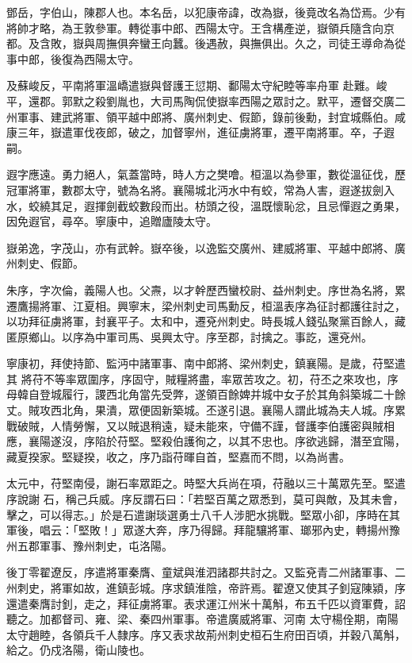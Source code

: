 \begin{pinyinscope}
 鄧岳，字伯山，陳郡人也。本名岳，以犯康帝諱，改為嶽，後竟改名為岱焉。少有將帥才略，為王敦參軍。轉從事中郎、西陽太守。王含構產逆，嶽領兵隨含向京都。及含敗，嶽與周撫俱奔蠻王向蠶。後遇赦，與撫俱出。久之，司徒王導命為從事中郎，後復為西陽太守。



 及蘇峻反，平南將軍溫嶠遣嶽與督護王愆期、鄱陽太守紀睦等率舟軍
 赴難。峻平，還郡。郭默之殺劉胤也，大司馬陶侃使嶽率西陽之眾討之。默平，遷督交廣二州軍事、建武將軍、領平越中郎將、廣州刺史、假節，錄前後勳，封宜城縣伯。咸康三年，嶽遣軍伐夜郎，破之，加督寧州，進征虜將軍，遷平南將軍。卒，子遐嗣。



 遐字應遠。勇力絕人，氣蓋當時，時人方之樊噲。桓溫以為參軍，數從溫征伐，歷冠軍將軍，數郡太守，號為名將。襄陽城北沔水中有蛟，常為人害，遐遂拔劍入水，蛟繞其足，遐揮劍截蛟數段而出。枋頭之役，溫既懷恥忿，且忌憚遐之勇果，因免遐官，尋卒。寧康中，追贈廬陵太守。



 嶽弟逸，字茂山，亦有武幹。嶽卒後，以逸監交廣州、建威將軍、平越中郎將、廣州刺史、假節。



 朱序，字次倫，義陽人也。父燾，以才幹歷西蠻校尉、益州刺史。序世為名將，累遷鷹揚將軍、江夏相。興寧末，梁州刺史司馬勳反，桓溫表序為征討都護往討之，以功拜征虜將軍，封襄平子。太和中，遷兗州刺史。時長城人錢弘聚黨百餘人，藏匿原鄉山。以序為中軍司馬、吳興太守。序至郡，討擒之。事訖，還兗州。



 寧康初，拜使持節、監沔中諸軍事、南中郎將、梁州刺史，鎮襄陽。是歲，苻堅遣其
 將苻不等率眾圍序，序固守，賊糧將盡，率眾苦攻之。初，苻丕之來攻也，序母韓自登城履行，謖西北角當先受弊，遂領百餘婢并城中女子於其角斜築城二十餘丈。賊攻西北角，果潰，眾便固新築城。丕遂引退。襄陽人謂此城為夫人城。序累戰破賊，人情勞懈，又以賊退稍遠，疑未能來，守備不謹，督護李伯護密與賊相應，襄陽遂沒，序陷於苻堅。堅殺伯護徇之，以其不忠也。序欲逃歸，潛至宜陽，藏夏揆家。堅疑揆，收之，序乃詣苻暉自首，堅嘉而不問，以為尚書。



 太元中，苻堅南侵，謝石率眾距之。時堅大兵尚在項，苻融以三十萬眾先至。堅遣序說謝
 石，稱己兵威。序反謂石曰：「若堅百萬之眾悉到，莫可與敵，及其未會，擊之，可以得志。」於是石遣謝琰選勇士八千人涉肥水挑戰。堅眾小卻，序時在其軍後，唱云：「堅敗！」眾遂大奔，序乃得歸。拜龍驤將軍、瑯邪內史，轉揚州豫州五郡軍事、豫州刺史，屯洛陽。



 後丁零翟遼反，序遣將軍秦膺、童斌與淮泗諸郡共討之。又監兗青二州諸軍事、二州刺史，將軍如故，進鎮彭城。序求鎮淮陰，帝許焉。翟遼又使其子釗寇陳潁，序還遣秦膺討釗，走之，拜征虜將軍。表求運江州米十萬斛，布五千匹以資軍費，詔聽之。加都督司、雍、梁、秦四州軍事。帝遣廣威將軍、河南
 太守楊佺期，南陽太守趙睦，各領兵千人隸序。序又表求故荊州刺史桓石生府田百頃，并穀八萬斛，給之。仍戍洛陽，衛山陵也。




\end{pinyinscope}
